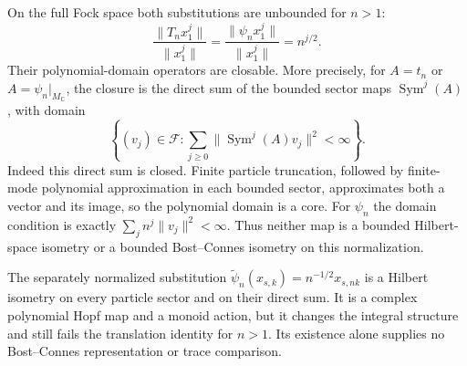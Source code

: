 On the full Fock space both substitutions are unbounded for \(n>1\):
\[
 \frac{\|T_nx_1^j\|}{\|x_1^j\|}
 =\frac{\|\psi_nx_1^j\|}{\|x_1^j\|}=n^{j/2}.
\]
Their polynomial-domain operators are closable. More precisely, for
\(A=t_n\) or \(A=\psi_n|_{M_{\mathbb C}}\), the closure is the direct
sum of the bounded sector maps \(\operatorname{Sym}^j(A)\), with domain
\[
 \left\{(v_j)\in\mathcal F:
        \sum_{j\ge0}\|\operatorname{Sym}^j(A)v_j\|^2<\infty\right\}.
\]
Indeed this direct sum is closed. Finite particle truncation, followed by
finite-mode polynomial approximation in each bounded sector, approximates
both a vector and its image, so the polynomial domain is a core.
For \(\psi_n\) the domain condition is exactly
\(\sum_j n^j\|v_j\|^2<\infty\).
Thus neither map is a bounded Hilbert-space isometry or a bounded
Bost--Connes isometry on this normalization.

The separately normalized substitution
\(\widetilde\psi_n(x_{s,k})=n^{-1/2}x_{s,nk}\) is a Hilbert isometry
on every particle sector and on their direct sum. It is a complex
polynomial Hopf map and a monoid action, but it changes the integral
structure and still fails the translation identity for \(n>1\).
Its existence alone supplies no Bost--Connes representation or trace
comparison.

